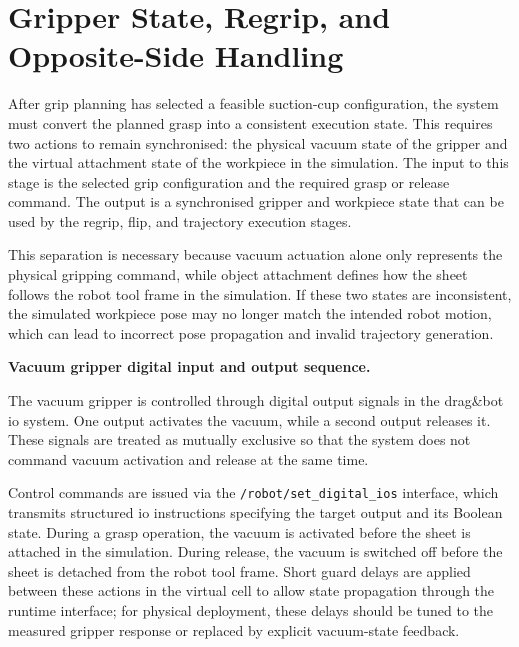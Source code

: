 
\section{Gripper State, Regrip, and Opposite-Side Handling}
\label{sec:gripper-control}

After grip planning has selected a feasible suction-cup configuration, the system must convert the planned grasp into a consistent execution state. This requires two actions to remain synchronised: the physical vacuum state of the gripper and the virtual attachment state of the workpiece in the simulation. The input to this stage is the selected grip configuration and the required grasp or release command. The output is a synchronised gripper and workpiece state that can be used by the regrip, flip, and trajectory execution stages.

This separation is necessary because vacuum actuation alone only represents the physical gripping command, while object attachment defines how the sheet follows the robot tool frame in the simulation. If these two states are inconsistent, the simulated workpiece pose may no longer match the intended robot motion, which can lead to incorrect pose propagation and invalid trajectory generation.

\label{sec:vacuum-gripper-digital-io-sequence}
\noindent\textbf{Vacuum gripper digital input and output sequence.}

The vacuum gripper is controlled through digital output signals in the drag\&bot \acs{io} system. One output activates the vacuum, while a second output releases it. These signals are treated as mutually exclusive so that the system does not command vacuum activation and release at the same time.

Control commands are issued via the \texttt{/robot/set\_digital\_ios} interface, which transmits structured \acs{io} instructions specifying the target output and its Boolean state. During a grasp operation, the vacuum is activated before the sheet is attached in the simulation. During release, the vacuum is switched off before the sheet is detached from the robot tool frame. Short guard delays are applied between these actions in the virtual cell to allow state propagation through the runtime interface; for physical deployment, these delays should be tuned to the measured gripper response or replaced by explicit vacuum-state feedback.


